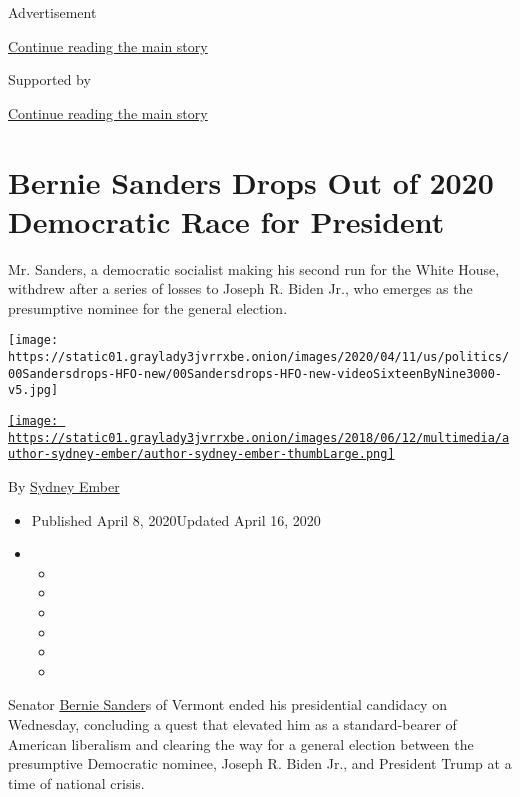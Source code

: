 Advertisement

\protect\hyperlink{after-top}{Continue reading the main story}

Supported by

\protect\hyperlink{after-sponsor}{Continue reading the main story}

\hypertarget{bernie-sanders-drops-out-of-2020-democratic-race-for-president}{%
\section{Bernie Sanders Drops Out of 2020 Democratic Race for
President}\label{bernie-sanders-drops-out-of-2020-democratic-race-for-president}}

Mr. Sanders, a democratic socialist making his second run for the White
House, withdrew after a series of losses to Joseph R. Biden Jr., who
emerges as the presumptive nominee for the general election.

\texttt{[image: https://static01.graylady3jvrrxbe.onion/images/2020/04/11/us/politics/00Sandersdrops-HFO-new/00Sandersdrops-HFO-new-videoSixteenByNine3000-v5.jpg]}

\href{https://www.nytimes3xbfgragh.onion/by/sydney-ember}{\texttt{[image: https://static01.graylady3jvrrxbe.onion/images/2018/06/12/multimedia/author-sydney-ember/author-sydney-ember-thumbLarge.png]}}

By \href{https://www.nytimes3xbfgragh.onion/by/sydney-ember}{Sydney
Ember}

\begin{itemize}
\item
  Published April 8, 2020Updated April 16, 2020
\item
  \begin{itemize}
  \item
  \item
  \item
  \item
  \item
  \item
  \end{itemize}
\end{itemize}

Senator
\href{https://www.nytimes3xbfgragh.onion/2020/04/16/us/politics/bernie-sanders-joe-biden-democrats.html}{Bernie
Sander}s of Vermont ended his presidential candidacy on Wednesday,
concluding a quest that elevated him as a standard-bearer of American
liberalism and clearing the way for a general election between the
presumptive Democratic nominee, Joseph R. Biden Jr., and President Trump
at a time of national crisis.

